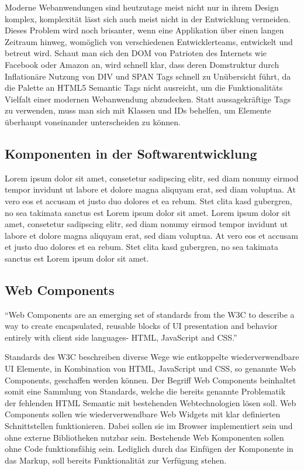 Moderne Webanwendungen sind heutzutage meist nicht nur in ihrem Design komplex, komplexität lässt sich auch meist nicht in der Entwicklung
vermeiden. Dieses Problem wird noch brisanter, wenn eine Applikation über einen langen Zeitraum hinweg,
womöglich von verschiedenen Entwicklerteams, entwickelt und betreut wird. Schaut man sich den DOM von Patrioten des Internets wie Facebook oder Amazon an,
wird schnell klar, dass deren Domstruktur durch Inflationäre Nutzung von DIV und SPAN Tags schnell zu Unübersicht führt,
da die Palette an HTML5 Semantic Tags nicht ausreicht, um die Funktionalitäts Vielfalt einer modernen Webanwendung abzudecken.
Statt aussagekräftige Tags zu verwenden, muss man sich mit Klassen und IDs behelfen, um Elemente überhaupt voneinander unterscheiden zu können.
\cite{sitepoint-introduction-to-webcomponents}

\subsection{Komponenten in der Softwarentwicklung}
Lorem ipsum dolor sit amet, consetetur sadipscing elitr, sed diam nonumy eirmod tempor invidunt ut labore et dolore magna aliquyam erat, sed diam voluptua. At vero eos et accusam et justo duo dolores et ea rebum. Stet clita kasd gubergren, no sea takimata sanctus est Lorem ipsum dolor sit amet. Lorem ipsum dolor sit amet, consetetur sadipscing elitr, sed diam nonumy eirmod tempor invidunt ut labore et dolore magna aliquyam erat, sed diam voluptua. At vero eos et accusam et justo duo dolores et ea rebum. Stet clita kasd gubergren, no sea takimata sanctus est Lorem ipsum dolor sit amet.



\subsection{Web Components}

``Web Components are an emerging set of standards from the W3C to describe a way to create encapsulated,
reusable blocks of UI presentation and behavior entirely with client side languages- HTML, JavaScript and CSS.''
\cite[42]{Web-Component-Architecture}
\vspace{1cm}

Standards des W3C beschreiben diverse Wege wie entkoppelte wiederverwendbare UI Elemente,
in Kombination von HTML, JavaScript und CSS, so genannte Web Components, geschaffen werden können.
Der Begriff Web Components beinhaltet somit eine Sammlung von Standards,
welche die bereits genannte Problematik der fehlenden HTML Semantic mit bestehenden Webtechnologien lösen soll.
Web Components sollen wie wiederverwendbare Web Widgets mit klar definierten Schnittstellen funktionieren.
Dabei sollen sie im Browser implementiert sein und ohne externe Bibliotheken nutzbar sein.
Bestehende Web Komponenten sollen ohne Code funktionsfähig sein. Lediglich durch das Einfügen der Komponente in das Markup,
soll bereits Funktionalität zur Verfügung stehen.
\cite[42]{Web-Component-Architecture}


